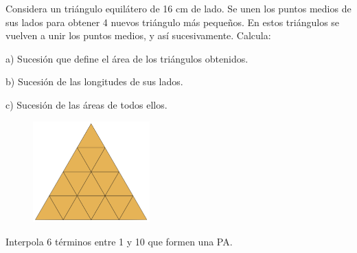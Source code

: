 \begin{mipropuesto}

\begin{multicols}{2}

Considera un triángulo equilátero de 16 cm de lado. Se unen los puntos medios de sus lados para obtener 4 nuevos triángulo más pequeños. En estos triángulos se vuelven a unir los puntos medios, y así sucesivamente. Calcula:

a) Sucesión que define el área de los triángulos obtenidos.	

b) Sucesión de las longitudes de sus lados.

c) Sucesión de las áreas de todos ellos.

\begin{figure}[H]
	\centering
	\includegraphics[width=0.4\textwidth]{img-suc/suc05.png}
\end{figure}


\end{multicols}

\end{mipropuesto}

\vspace{-8mm}
\begin{flushright}
\begin{footnotesize} \textcolor{gris}{}	\end{footnotesize}
\end{flushright}


\begin{mipropuesto}

Interpola 6 términos entre 1 y 10 que formen una PA.
\end{mipropuesto}

\vspace{-8mm}
\begin{flushright}
\begin{footnotesize} \textcolor{gris}{}	\end{footnotesize}
\end{flushright}


